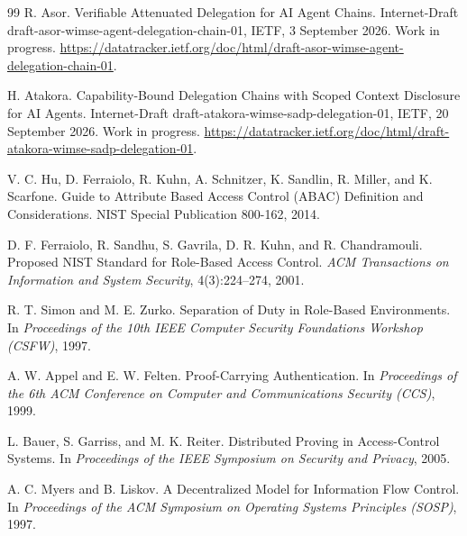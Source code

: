 \documentclass[10pt,twocolumn]{article}
\begin{document}
\begin{thebibliography}{99}
R. Asor.
\newblock Verifiable Attenuated Delegation for AI Agent Chains.
\newblock Internet-Draft draft-asor-wimse-agent-delegation-chain-01, IETF,
3 September 2026. Work in progress.
\newblock \url{https://datatracker.ietf.org/doc/html/draft-asor-wimse-agent-delegation-chain-01}.

H. Atakora.
\newblock Capability-Bound Delegation Chains with Scoped Context Disclosure for
AI Agents.
\newblock Internet-Draft draft-atakora-wimse-sadp-delegation-01, IETF,
20 September 2026. Work in progress.
\newblock \url{https://datatracker.ietf.org/doc/html/draft-atakora-wimse-sadp-delegation-01}.

V. C. Hu, D. Ferraiolo, R. Kuhn, A. Schnitzer, K. Sandlin, R. Miller, and
K. Scarfone.
\newblock Guide to Attribute Based Access Control (ABAC) Definition and
Considerations.
\newblock NIST Special Publication 800-162, 2014.

D. F. Ferraiolo, R. Sandhu, S. Gavrila, D. R. Kuhn, and R. Chandramouli.
\newblock Proposed NIST Standard for Role-Based Access Control.
\newblock \emph{ACM Transactions on Information and System Security},
4(3):224--274, 2001.

R. T. Simon and M. E. Zurko.
\newblock Separation of Duty in Role-Based Environments.
\newblock In \emph{Proceedings of the 10th IEEE Computer Security Foundations
Workshop (CSFW)}, 1997.

A. W. Appel and E. W. Felten.
\newblock Proof-Carrying Authentication.
\newblock In \emph{Proceedings of the 6th ACM Conference on Computer and
Communications Security (CCS)}, 1999.

L. Bauer, S. Garriss, and M. K. Reiter.
\newblock Distributed Proving in Access-Control Systems.
\newblock In \emph{Proceedings of the IEEE Symposium on Security and Privacy},
2005.

A. C. Myers and B. Liskov.
\newblock A Decentralized Model for Information Flow Control.
\newblock In \emph{Proceedings of the ACM Symposium on Operating Systems
Principles (SOSP)}, 1997.

\end{thebibliography}
\end{document}
